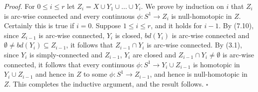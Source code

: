 \textit{Proof.} For $0 \le i \le r$ let $Z_i = X \cup Y_1 \cup \dots \cup Y_i$. We prove by induction on $i$ that $Z_i$ is arc-wise connected and every continuous $\phi \colon S^1 \to Z_i$ is null-homotopic in $Z$. Certainly this is true if $i = 0$. Suppose $1 \le i \le r$, and it holds for $i - 1$. By (7.10), since $Z_{i-1}$ is arc-wise connected, $Y_i$ is closed, $bd(Y_i)$ is arc-wise connected and $\emptyset \ne bd(Y_i) \subseteq Z_{i-1}$, it follows that $Z_{i-1} \cap Y_i$ is arc-wise connected. By (3.1), since $Y_i$ is simply-connected and $Z_{i-1}$, $Y_i$ are closed and $Z_{i-1} \cap Y_i \ne \emptyset$ is arc-wise connected, it follows that every continuous $\phi \colon S^1 \to Y_i \cup Z_{i-1}$ is homotopic in $Y_i \cup Z_{i-1}$ and hence in $Z$ to some $\phi \colon S^1 \to Z_{i-1}$, and hence is null-homotopic in $Z$. This completes the inductive argument, and the result follows. $\square$

